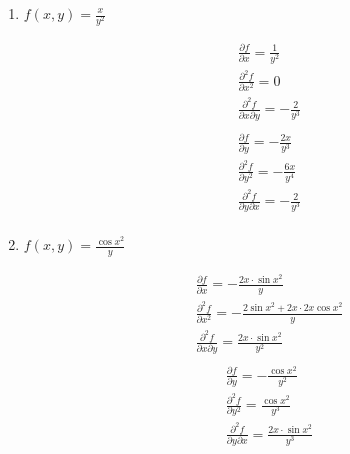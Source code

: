 \begin{enumerate}
  \item %
$f(x, y) = \frac{x}{y^2}$ \\
\begin{paracol}{2}
\begin{align*}
  &\frac{\partial f}{\partial x} = \frac{1}{y^2} \\
  &\frac{\partial^2 f}{\partial x^2} = 0 \\
  &\frac{\partial^2 f}{\partial x \partial y} = -\frac{2}{y^3} \\
\end{align*}
\switchcolumn%
\begin{align*}
  &\frac{\partial f}{\partial y} = -\frac{2x}{y^3}\\
  &\frac{\partial^2 f}{\partial y^2} = -\frac{6x}{y^4} \\
  &\frac{\partial^2 f}{\partial y \partial x} = -\frac{2}{y^3}\\
\end{align*}
\end{paracol}

  \item %
$f(x, y) = \frac{\cos x^2}{y}$ \\
\begin{paracol}{2}
\begin{align*}
  &\frac{\partial f}{\partial x} = -\frac{2x\cdot \sin x^2}{y} \\
  &\frac{\partial^2 f}{\partial x^2} = -\frac{2\sin x^2 + 2x\cdot 2x\cos x^2}{y} \\
  &\frac{\partial^2 f}{\partial x \partial y} = \frac{2x\cdot \sin x^2}{y^2} \\
\end{align*}
\switchcolumn%
\begin{align*}
  &\frac{\partial f}{\partial y} = -\frac{\cos x^2}{y^2} \\
  &\frac{\partial^2 f}{\partial y^2} = \frac{\cos x^2}{y^3} \\
  &\frac{\partial^2 f}{\partial y \partial x} = \frac{2x\cdot \sin x^2}{y^3} \\
\end{align*}
\end{paracol}


\end{enumerate}
